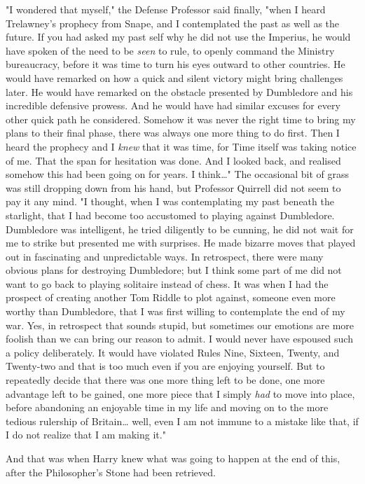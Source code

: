 "I wondered that myself," the Defense Professor said finally, "when I heard 
Trelawney's prophecy from Snape, and I contemplated the past as well as the 
future. If you had asked my past self why he did not use the Imperius, he would 
have spoken of the need to be \emph{seen} to rule, to openly command the 
Ministry bureaucracy, before it was time to turn his eyes outward to other 
countries. He would have remarked on how a quick and silent victory might bring 
challenges later. He would have remarked on the obstacle presented by 
Dumbledore and his incredible defensive prowess. And he would have had similar 
excuses for every other quick path he considered. Somehow it was never the 
right time to bring my plans to their final phase, there was always one more 
thing to do first. Then I heard the prophecy and I \emph{knew} that it was 
time, for Time itself was taking notice of me. That the span for hesitation was 
done. And I looked back, and realised somehow this had been going on for years. 
I think{\ldots}" The occasional bit of grass was still dropping down from his 
hand, but Professor Quirrell did not seem to pay it any mind. "I thought, when 
I was contemplating my past beneath the starlight, that I had become too 
accustomed to playing against Dumbledore. Dumbledore was intelligent, he tried 
diligently to be cunning, he did not wait for me to strike but presented me 
with surprises. He made bizarre moves that played out in fascinating and 
unpredictable ways. In retrospect, there were many obvious plans for destroying 
Dumbledore; but I think some part of me did not want to go back to playing 
solitaire instead of chess. It was when I had the prospect of creating another 
Tom Riddle to plot against, someone even more worthy than Dumbledore, that I 
was first willing to contemplate the end of my war. Yes, in retrospect that 
sounds stupid, but sometimes our emotions are more foolish than we can bring 
our reason to admit. I would never have espoused such a policy deliberately. It 
would have violated Rules Nine, Sixteen, Twenty, and Twenty-two and that is too 
much even if you are enjoying yourself. But to repeatedly decide that there was 
one more thing left to be done, one more advantage left to be gained, one more 
piece that I simply \emph{had} to move into place, before abandoning an 
enjoyable time in my life and moving on to the more tedious rulership of 
Britain{\ldots} well, even I am not immune to a mistake like that, if I do not 
realize that I am making it."

And that was when Harry knew what was going to happen at the end of this, after 
the Philosopher's Stone had been retrieved.

